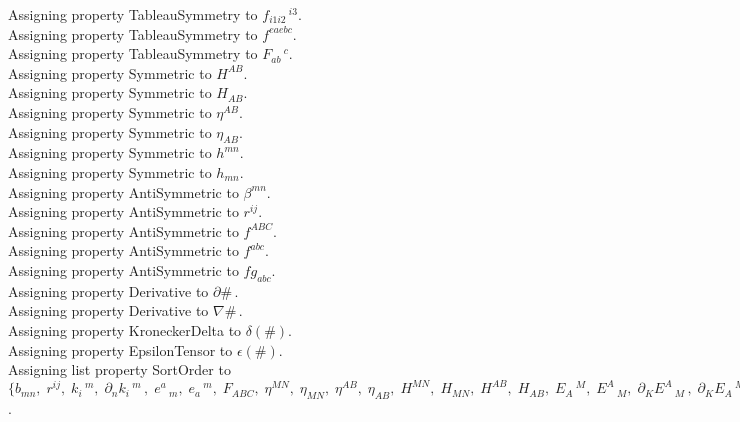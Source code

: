 \documentclass[11pt]{article}
\begin{document}
Assigning property TableauSymmetry to ${f}_{i1 i2}\,^{i3}$.
\\
Assigning property TableauSymmetry to ${f}^{ea eb c}$.
\\
Assigning property TableauSymmetry to ${F}_{a b}\,^{c}$.
\\
Assigning property Symmetric to ${H}^{A B}$.
\\
Assigning property Symmetric to ${H}_{A B}$.
\\
Assigning property Symmetric to ${\eta}^{A B}$.
\\
Assigning property Symmetric to ${\eta}_{A B}$.
\\
Assigning property Symmetric to ${h}^{m n}$.
\\
Assigning property Symmetric to ${h}_{m n}$.
\\
Assigning property AntiSymmetric to ${\beta}^{m n}$.
\\
Assigning property AntiSymmetric to ${r}^{i j}$.
\\
Assigning property AntiSymmetric to ${f}^{A B C}$.
\\
Assigning property AntiSymmetric to ${f}^{a b c}$.
\\
Assigning property AntiSymmetric to ${fg}_{a b c}$.
\\
Assigning property Derivative to $\partial{\#}\, $.
\\
Assigning property Derivative to $\nabla{\#}\, $.
\\
Assigning property KroneckerDelta to $\delta(\#)$.
\\
Assigning property EpsilonTensor to $\epsilon(\#)$.
\\
Assigning list property SortOrder to $\{{b}_{m n},\; {r}^{i j},\; {k}_{i}\,^{m},\; {\partial}_{n}{{k}_{i}\,^{m}}\, ,\; {e}^{a}\,_{m},\; {e}_{a}\,^{m},\; {F}_{A B C},\; {\eta}^{M N},\; {\eta}_{M N},\; {\eta}^{A B},\; {\eta}_{A B},\; {H}^{M N},\; {H}_{M N},\; {H}^{A B},\; {H}_{A B},\; {E}_{A}\,^{M},\; {E}^{A}\,_{M},\; {\partial}_{K}{{E}^{A}\,_{M}}\, ,\; {\partial}_{K}{{E}_{A}\,^{M}}\, ,\; {\partial}_{K L}{{E}_{A}\,^{M}}\, ,\; {g}_{ea b},\; {f}^{ea eb c}\}$.
\end{document}
